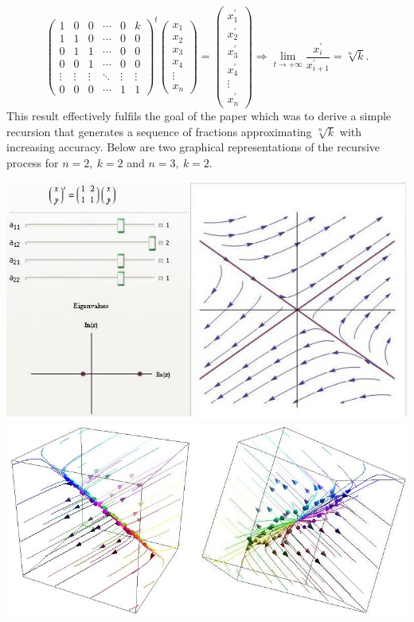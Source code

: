 \documentclass[11pt]{article}
\theoremstyle{plain}
\theoremstyle{definition}
\begin{document}
\begin{equation*}
\left(\begin{array}{cccccc}
1 & 0 & 0 & \cdots  & 0 & k \\
1 & 1 & 0 & \cdots  & 0 & 0 \\
0 & 1 & 1 & \cdots  & 0 & 0 \\
0 & 0 & 1 & \cdots  & 0 & 0 \\
\vdots & \vdots  & \vdots  & \ddots  & \vdots  & \vdots  \\
0 & 0 & 0 & \cdots  & 1 & 1\end{array}\right)^t
\left(\begin{array}{c}
x_1 \\
x_2 \\
x_3 \\
x_4 \\
\vdots \\
x_n\end{array}\right)
=
\left(\begin{array}{c}
x^\prime_1 \\
x^\prime_2 \\
x^\prime_3 \\
x^\prime_4 \\
\vdots \\
x^\prime_n\end{array}\right)
\Rightarrow
\displaystyle\lim_{t\to+\infty}\frac{x^\prime_i}{x^\prime_{i+1}}=\sqrt[n]{k}.
\end{equation*}
 This result effectively fulfils the goal of the paper which was to derive a simple recursion that generates a sequence of fractions approximating $\sqrt[n]{k}$ with increasing accuracy. Below are two graphical representations of the recursive process for $n=2,\ k=2$ and $n=3,\ k=2$.

  \begin{centering}
    \includegraphics[width=.9\textwidth]{phase plot 2D.jpg}
    \includegraphics[width=.9\textwidth]{phase plot 3D.jpg}
    \end{centering}
\end{document}
